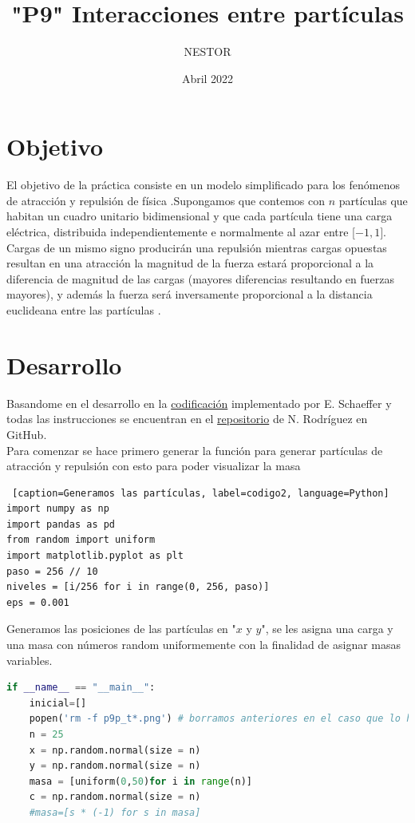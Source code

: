 \documentclass{article}
\title{"P9" Interacciones entre partículas}
\author{NESTOR}
\date {Abril 2022}
\begin{document}
\maketitle

\section{Objetivo}\label{obj}
El objetivo de la práctica consiste en un modelo simplificado para los fenómenos de atracción y repulsión de física .Supongamos que contemos con $n$ partículas que habitan un cuadro unitario bidimensional y que cada partícula tiene una carga eléctrica, distribuida independientemente e normalmente al azar entre [$-1,1]$. Cargas de un mismo signo producirán una repulsión mientras cargas opuestas resultan en una atracción la magnitud de la fuerza estará proporcional a la diferencia de magnitud de las cargas (mayores diferencias resultando en fuerzas mayores), y además la fuerza será inversamente proporcional a la distancia euclideana entre las partículas \cite{elisa1}.

\section{Desarrollo}\label{des}
Basandome en el desarrollo en la \href{https://github.com/satuelisa/Simulation/blob/master/Particles/creation.py}{codificación} implementado por E. Schaeffer y todas las instrucciones se encuentran en el  \href{https://github.com/NestorZeus/SIMULACION-COMPUTACIONAL-DE-NANOMATERIALES/tree/main/P9}{repositorio} de N. Rodríguez en GitHub.\\

Para comenzar se hace primero generar la función para generar partículas de atracción y repulsión con esto para poder visualizar la masa

\begin{lstlisting} [caption=Generamos las partículas, label=codigo2, language=Python]
import numpy as np
import pandas as pd
from random import uniform 
import matplotlib.pyplot as plt
paso = 256 // 10
niveles = [i/256 for i in range(0, 256, paso)]
eps = 0.001
\end{lstlisting}

Generamos las posiciones de las partículas en "$x$ y $y$", se les asigna una carga y una masa con números random uniformemente con la finalidad de asignar masas variables.

\begin{lstlisting}[caption=Partículas en "$x$ y $y$", label=codigo2, language=Python]
if __name__ == "__main__":
    inicial=[]
    popen('rm -f p9p_t*.png') # borramos anteriores en el caso que lo hayamos corrido
    n = 25
    x = np.random.normal(size = n)
    y = np.random.normal(size = n)
    masa = [uniform(0,50)for i in range(n)]
    c = np.random.normal(size = n)
    #masa=[s * (-1) for s in masa]
\end{lstlisting}
\end{document}
